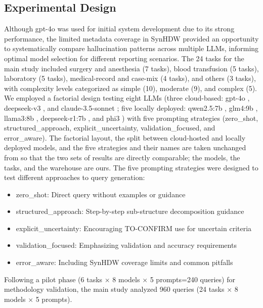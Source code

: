 \documentclass[applsci,article,submit,pdftex,oneauthor]{Definitions/mdpi}
\begin{document}
\subsection{Experimental Design}\label{sec:expdesign}
Although gpt-4o was used for initial system development due to its strong
performance, the limited metadata coverage in SynHDW provided an opportunity to
systematically compare hallucination patterns across multiple LLMs, informing
optimal model selection for different reporting scenarios. The 24 tasks for the
main study included surgery and anesthesia (7 tasks), blood transfusion (5
tasks), laboratory (5 tasks), medical-record and case-mix (4 tasks), and others
(3 tasks), with complexity levels categorized as simple (10), moderate (9), and
complex (5). We employed a factorial design testing eight LLMs (three
cloud-based: gpt-4o \cite{gpt4}, deepseek-v3 \cite{dsv3}, and claude-3.5-sonnet
\cite{claude35}; five locally deployed: qwen2.5:7b \cite{qwen25}, glm4:9b
\cite{glm4}, llama3:8b \cite{llama3}, deepseek-r1:7b \cite{dsr1}, and phi3
\cite{phi3}) with five prompting
strategies (zero\_shot, structured\_approach, explicit\_uncertainty,
validation\_focused, and error\_aware). The factorial layout, the split between
cloud-hosted and locally deployed models, and the five strategies and their names
are taken unchanged from \cite{lee2025} so that the two sets of results are
directly comparable; the models, the tasks, and the warehouse are ours. The five
prompting strategies were designed to test different approaches to query
generation:

\begin{itemize}[leftmargin=1.4em,itemsep=1pt,topsep=2pt]
  \item zero\_shot: Direct query without examples or guidance
  \item structured\_approach: Step-by-step sub-structure decomposition guidance
  \item explicit\_uncertainty: Encouraging TO-CONFIRM use for uncertain criteria
  \item validation\_focused: Emphasizing validation and accuracy requirements
  \item error\_aware: Including SynHDW coverage limits and common pitfalls
\end{itemize}

\noindent Following a pilot phase (6 tasks $\times$ 8 models $\times$ 5
prompts=240 queries) for methodology validation, the main study analyzed 960
queries (24 tasks $\times$ 8 models $\times$ 5 prompts).
\end{document}
